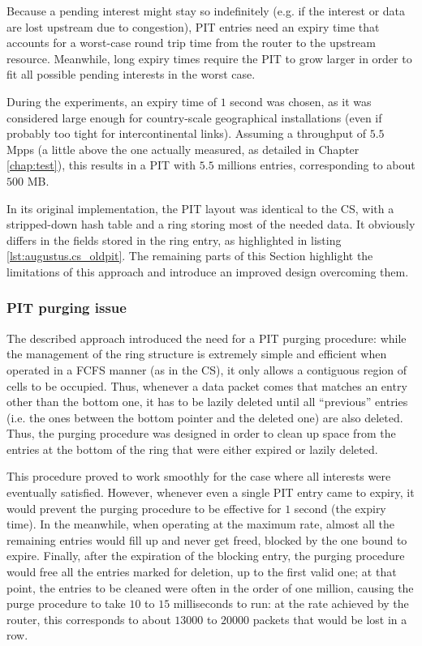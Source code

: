 \documentclass[11pt,a4paper,twoside,titlepage,openany]{book}
\begin{document}
Because a pending interest might stay so indefinitely (e.g. if the interest or data are lost upstream due to congestion), PIT entries need an expiry time that accounts for a worst-case round trip time from the router to the upstream resource. Meanwhile, long expiry times require the PIT to grow larger in order to fit all possible pending interests in the worst case.

During the experiments, an expiry time of $1$ second was chosen, as it was considered large enough for country-scale geographical installations (even if probably too tight for intercontinental links). Assuming a throughput of $5.5$ \gls{Mpps} (a little above the one actually measured, as detailed in Chapter \ref{chap:test}), this results in a PIT with $5.5$ millions entries, corresponding to about $500$ MB.

In its original implementation, the PIT layout was identical to the CS, with a stripped-down hash table and a ring storing most of the needed data. It obviously differs in the fields stored in the ring entry, as highlighted in listing \ref{lst:augustus.cs_oldpit}. The remaining parts of this Section highlight the limitations of this approach and introduce an improved design overcoming them.

\subsubsection{PIT purging issue}\label{sec:augustus.pit.purge}
The described approach introduced the need for a PIT purging procedure: while the management of the ring structure is extremely simple and efficient when operated in a FCFS manner (as in the CS), it only allows a contiguous region of cells to be occupied. Thus, whenever a data packet comes that matches an entry other than  the bottom one, it has to be lazily deleted until all ``previous'' entries (i.e. the ones between the bottom pointer and the deleted one) are also deleted.  
Thus, the purging procedure was designed in order to clean up space from the entries at the bottom of the ring that were either expired or lazily deleted.

This procedure proved to work smoothly for the case where all interests were eventually satisfied. However, whenever even a single PIT entry came to expiry, it would prevent the purging procedure to be effective for $1$ second (the expiry time). In the meanwhile, when operating at the maximum rate, almost all the remaining entries would fill up and never get freed, blocked by the one bound to expire. Finally, after the expiration of the blocking entry, the purging procedure would free all the entries marked for deletion, up to the first valid one; at that point, the entries to be cleaned were often in the order of one million, causing the purge procedure to take $10$ to $15$ milliseconds to run: at the rate achieved by the router, this corresponds to about $13000$ to $20000$ packets that would be lost in a row.
\end{document}
